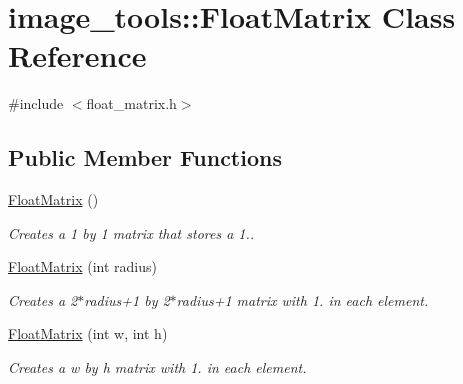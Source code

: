 \hypertarget{classimage__tools_1_1FloatMatrix}{}\section{image\+\_\+tools\+:\+:Float\+Matrix Class Reference}
\label{classimage__tools_1_1FloatMatrix}


{\ttfamily \#include $<$float\+\_\+matrix.\+h$>$}

\subsection*{Public Member Functions}
\begin{DoxyCompactItemize}
\item 
\mbox{\label{classimage__tools_1_1FloatMatrix_a8d7d1e54d9234af0628af1e291b3196e}} 
\hyperlink{classimage__tools_1_1FloatMatrix_a8d7d1e54d9234af0628af1e291b3196e}{Float\+Matrix} ()
\begin{DoxyCompactList}\small\item\em Creates a 1 by 1 matrix that stores a 1.. \end{DoxyCompactList}\item 
\mbox{\label{classimage__tools_1_1FloatMatrix_aab08d9de439a8ce50465cb80019f1ca2}} 
\hyperlink{classimage__tools_1_1FloatMatrix_aab08d9de439a8ce50465cb80019f1ca2}{Float\+Matrix} (int radius)
\begin{DoxyCompactList}\small\item\em Creates a 2$\ast$radius+1 by 2$\ast$radius+1 matrix with 1. in each element. \end{DoxyCompactList}\item 
\mbox{\label{classimage__tools_1_1FloatMatrix_a98708d33731113bdd36d59698ff77418}} 
\hyperlink{classimage__tools_1_1FloatMatrix_a98708d33731113bdd36d59698ff77418}{Float\+Matrix} (int w, int h)
\begin{DoxyCompactList}\small\item\em Creates a w by h matrix with 1. in each element. \end{DoxyCompactList}\item 
\mbox{\label{classimage__tools_1_1FloatMatrix_a34f7a09d3703aafb012a1e0bbb1803f0}} 

\end{DoxyCompactItemize}
